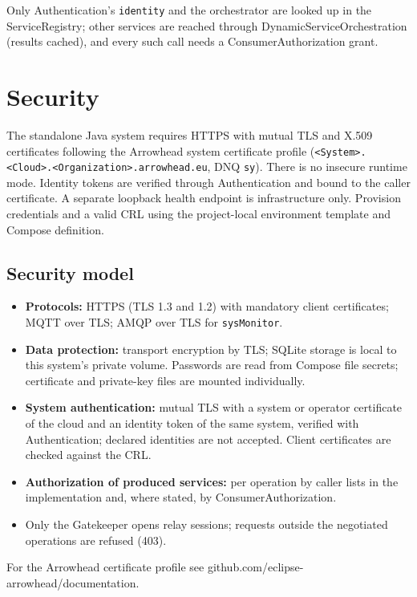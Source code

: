 \documentclass[a4paper]{arrowhead}
\begin{document}
Only Authentication's \texttt{identity} and the orchestrator are looked up in the ServiceRegistry; other services are reached through DynamicServiceOrchestration (results cached), and every such call needs a ConsumerAuthorization grant.

\newpage

\section{Security}
\label{sec:security}

The standalone Java system requires HTTPS with mutual TLS and X.509 certificates following the Arrowhead system certificate profile (\texttt{<System>.<Cloud>.<Organization>.arrowhead.eu}, DNQ \texttt{sy}). There is no insecure runtime mode. Identity tokens are verified through Authentication and bound to the caller certificate. A separate loopback health endpoint is infrastructure only. Provision credentials and a valid CRL using the project-local environment template and Compose definition.

\subsection{Security model}


\begin{itemize}
  \item \textbf{Protocols:} HTTPS (TLS 1.3 and 1.2) with mandatory client certificates; MQTT over TLS; AMQP over TLS for \texttt{sysMonitor}.
  \item \textbf{Data protection:} transport encryption by TLS; SQLite storage is local to this system's private volume. Passwords are read from Compose file secrets; certificate and private-key files are mounted individually.
  \item \textbf{System authentication:} mutual TLS with a system or operator certificate of the cloud and an identity token of the same system, verified with Authentication; declared identities are not accepted. Client certificates are checked against the CRL.
  \item \textbf{Authorization of produced services:} per operation by caller lists in the implementation and, where stated, by ConsumerAuthorization.
  \item Only the Gatekeeper opens relay sessions; requests outside the negotiated operations are refused (403).
\end{itemize}

For the Arrowhead certificate profile see github.com/eclipse-arrowhead/documentation.
\end{document}
